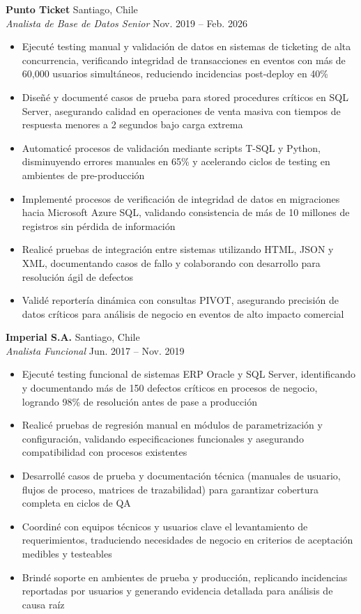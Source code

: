 \documentclass[11pt,letterpaper]{article}
\begin{document}
\textbf{Punto Ticket} \hfill Santiago, Chile\\
\textit{Analista de Base de Datos Senior} \hfill Nov. 2019 – Feb. 2026
\begin{itemize}
  \item Ejecuté testing manual y validación de datos en sistemas de ticketing de alta concurrencia, verificando integridad de transacciones en eventos con más de 60,000 usuarios simultáneos, reduciendo incidencias post-deploy en 40\%
  \item Diseñé y documenté casos de prueba para stored procedures críticos en SQL Server, asegurando calidad en operaciones de venta masiva con tiempos de respuesta menores a 2 segundos bajo carga extrema
  \item Automaticé procesos de validación mediante scripts T-SQL y Python, disminuyendo errores manuales en 65\% y acelerando ciclos de testing en ambientes de pre-producción
  \item Implementé procesos de verificación de integridad de datos en migraciones hacia Microsoft Azure SQL, validando consistencia de más de 10 millones de registros sin pérdida de información
  \item Realicé pruebas de integración entre sistemas utilizando HTML, JSON y XML, documentando casos de fallo y colaborando con desarrollo para resolución ágil de defectos
  \item Validé reportería dinámica con consultas PIVOT, asegurando precisión de datos críticos para análisis de negocio en eventos de alto impacto comercial
\end{itemize}
\vspace{2pt}
\textbf{Imperial S.A.} \hfill Santiago, Chile\\
\textit{Analista Funcional} \hfill Jun. 2017 – Nov. 2019
\begin{itemize}
  \item Ejecuté testing funcional de sistemas ERP Oracle y SQL Server, identificando y documentando más de 150 defectos críticos en procesos de negocio, logrando 98\% de resolución antes de pase a producción
  \item Realicé pruebas de regresión manual en módulos de parametrización y configuración, validando especificaciones funcionales y asegurando compatibilidad con procesos existentes
  \item Desarrollé casos de prueba y documentación técnica (manuales de usuario, flujos de proceso, matrices de trazabilidad) para garantizar cobertura completa en ciclos de QA
  \item Coordiné con equipos técnicos y usuarios clave el levantamiento de requerimientos, traduciendo necesidades de negocio en criterios de aceptación medibles y testeables
  \item Brindé soporte en ambientes de prueba y producción, replicando incidencias reportadas por usuarios y generando evidencia detallada para análisis de causa raíz
\end{itemize}
\end{document}
